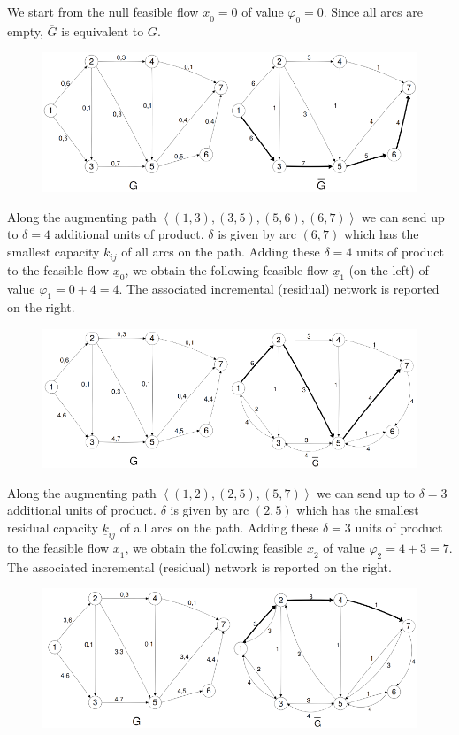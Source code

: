 \documentclass[12pt, a4paper]{report}
\begin{document}
        We start from the null feasible flow $\underline{x}_0=0$ of value $\varphi_0 = 0$. Since all arcs are empty, $\overline{G}$ is equivalent to $G$.
        \begin{figure}[H]
            \centering
            \includegraphics[width=0.9\linewidth]{images/maxcut1.png}
        \end{figure}
        Along the augmenting path $\left\langle (1, 3),(3, 5),(5, 6),(6, 7)\right\rangle $ we can send up to $\delta = 4$ additional units of product. $\delta$ is given 
        by arc $(6, 7)$ which has the smallest capacity $k_{ij}$ of all arcs on the path. Adding these $\delta=4$ units of product to the feasible flow $\underline{x}_0$, 
        we obtain the following feasible flow $\underline{x}_1$ (on the left) of value $\varphi_1 = 0 + 4 = 4$. The associated incremental (residual) network is reported 
        on the right.
        \begin{figure}[H]
            \centering
            \includegraphics[width=0.9\linewidth]{images/maxcut2.png}
        \end{figure}
        Along the augmenting path $\left\langle (1, 2),(2, 5),(5, 7)\right\rangle $ we can send up to $\delta = 3$ additional units of product. $\delta$ is given by arc 
        $(2, 5)$ which has the smallest residual capacity $\underline{k}_{ij}$ of all arcs on the path. Adding these $\delta = 3$ units of product to the feasible flow 
        $\underline{x}_1$, we obtain the following feasible $\underline{x}_2$ of value $\varphi_2 = 4 + 3 = 7$. The associated incremental (residual) network is reported 
        on the right.
        \begin{figure}[H]
            \centering
            \includegraphics[width=0.9\linewidth]{images/maxcut3.png}
        \end{figure}
\end{document}
